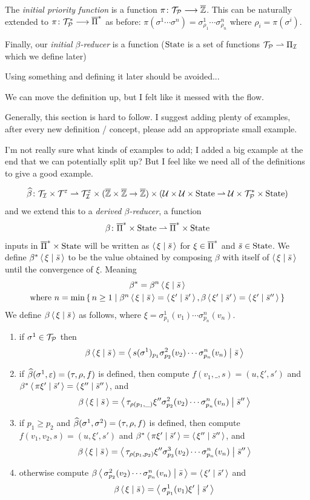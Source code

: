 \documentclass{llncs}
\newcommand{\yoni}[1]{{\begin{mdframed}[linecolor=red]{\color{red}#1}\end{mdframed}}}
\newcommand{\ari}[1]{{\begin{mdframed}[linecolor=blue]{\color{blue}#1}\end{mdframed}}}
\begin{document}
The \textit{initial priority function} is a function $\pi\colon\mathcal T_{\mathcal P}\longrightarrow\overline{\mathbb Z}$.
This can be naturally extended to $\pi\colon\mathcal T_{\mathcal P}^*\longrightarrow\overline{\Pi}^*$ as before: $\pi(\sigma^1\cdots\sigma^n)=\sigma^1_{\rho_1}\cdots\sigma^n_{\rho_n}$ where $\rho_i=\pi(\sigma^i)$.

Finally, our \textit{initial $\beta$-reducer} is a function ($\mathrm{State}$ is a set of functions $\mathcal T_{\mathcal P}\rightharpoonup\Pi_{\mathcal I}$ which we define later)
\yoni{Using something and defining it later should be avoided...}
\ari{We can move the definition up, but I felt like it messed with the flow.}

\yoni{Generally, this section is hard to follow. I suggest adding plenty of examples, after every new definition / concept, please add an appropriate small example.}
\ari{I'm not really sure what kinds of examples to add; I added a big example at the end that we can potentially split up?
But I feel like we need all of the definitions to give a good example.}

\[ \widehat\beta\colon\mathcal T_{\mathcal I}\times\mathcal T^\varepsilon \rightharpoonup \mathcal T_{\mathcal I}^\varepsilon\times(\overline{\mathbb Z}\times\overline{\mathbb Z}\to\overline{\mathbb Z})\times(\mathcal U\times\mathcal U\times\mathrm{State}\rightharpoonup\mathcal U\times\mathcal T_{\mathcal P}^*\times\mathrm{State}) \]
and we extend this to a \textit{derived $\beta$-reducer}, a function
\[ \beta\colon\overline{\Pi}^*\times\mathrm{State} \rightharpoonup \overline{\Pi}^*\times\mathrm{State} \]
inputs in $\overline{\Pi}^*\times\mathrm{State}$ will be written as $\gen\xi[\bar s]$ for $\xi\in\overline{\Pi}^*$ and $\bar s\in\mathrm{State}$.
We define $\beta^*\gen\xi[\bar s]$ to be the value obtained by composing $\beta$ with itself of $\gen\xi[\bar s]$ until the convergence of $\xi$.
Meaning
\begin{multline*}
    \beta^* = \beta^n\gen\xi[\bar s]\\
    \hbox{where $n=\min\set{n\geq1}[{\beta^n\gen\xi[\bar s]=\gen{\xi'}[\bar s'],\beta\gen{\xi'}[\bar s']=\gen{\xi'}[\bar s'']}]$}
\end{multline*}
We define $\beta\gen\xi[\bar s]$ as follows, where $\xi=\sigma^1_{p_1}(v_1)\cdots\sigma^n_{p_n}(v_n)$.
\begin{enumerate}
    \item if $\sigma^1\in\mathcal T_{\mathcal P}$ then
    \[ \beta\gen\xi[\bar s] = \gen{s(\sigma^1)_{p_1}\sigma^2_{p_2}(v_2)\cdots\sigma^n_{p_n}(v_n)}[\bar s] \]
    \item if $\widehat\beta(\sigma^1,\varepsilon)=(\tau,\rho,f)$ is defined, then compute $f(v_1,\_,s)=(u,\xi',s')$ and $\beta^*\gen{\pi\xi'}[\bar s']=\gen{\xi''}[\bar s'']$, and
    \[ \beta\gen\xi[\bar s] = \gen{\tau_{\rho(p_1,\_)}\xi''\sigma^2_{p_2}(v_2)\cdots\sigma^n_{p_n}(v_n)}[\bar s''] \]
    \item if $p_1\geq p_2$ and $\widehat\beta(\sigma^1,\sigma^2)=(\tau,\rho,f)$ is defined, then compute $f(v_1,v_2,s)=(u,\xi',s')$ and $\beta^*\gen{\pi\xi'}[\bar s']=\gen{\xi''}[\bar s'']$, and
    \[ \beta\gen\xi[\bar s] = \gen{\tau_{\rho(p_1,p_2)}\xi''\sigma^3_{p_3}(v_2)\cdots\sigma^n_{p_n}(v_n)}[\bar s''] \]
    \item otherwise compute $\beta\gen{\sigma^2_{p_2}(v_2)\cdots\sigma^n_{p_n}(v_n)}[\bar s]=\gen{\xi'}[\bar s']$ and
    \[ \beta\gen\xi[\bar s] = \gen{\sigma^1_{p_1}(v_1)\xi'}[\bar s'] \]
\end{enumerate}
\end{document}
